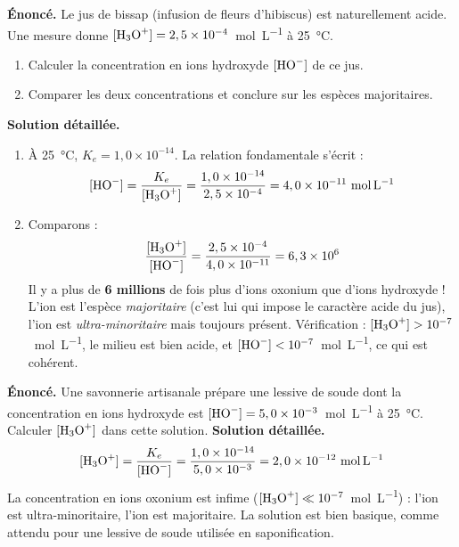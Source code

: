 \documentclass[11pt]{article}
\begin{document}
\begin{exoresolu}
\textbf{Énoncé.} Le jus de bissap (infusion de fleurs d'hibiscus) est naturellement acide. Une mesure donne $[\ce{H3O+}] = 2,5 \times 10^{-4}$~\si{mol.L^{-1}} à \SI{25}{\celsius}.
\begin{enumerate}
\item Calculer la concentration en ions hydroxyde $[\ce{HO-}]$ de ce jus.
\item Comparer les deux concentrations et conclure sur les espèces majoritaires.
\end{enumerate}
\tcblower
\textbf{Solution détaillée.}
\begin{enumerate}
\item À \SI{25}{\celsius}, $K_e = 1,0 \times 10^{-14}$. La relation fondamentale s'écrit :
\[ [\ce{HO-}] = \frac{K_e}{[\ce{H3O+}]} = \frac{1,0 \times 10^{-14}}{2,5 \times 10^{-4}} = 4,0 \times 10^{-11}~\si{mol.L^{-1}} \]
\item Comparons :
\[ \frac{[\ce{H3O+}]}{[\ce{HO-}]} = \frac{2,5 \times 10^{-4}}{4,0 \times 10^{-11}} = 6,3 \times 10^{6} \]
Il y a plus de \textbf{6 millions} de fois plus d'ions oxonium que d'ions hydroxyde ! L'ion  est l'espèce \emph{majoritaire} (c'est lui qui impose le caractère acide du jus), l'ion  est \emph{ultra-minoritaire} mais toujours présent. Vérification : $[\ce{H3O+}] > 10^{-7}$~\si{mol.L^{-1}}, le milieu est bien acide, et $[\ce{HO-}] < 10^{-7}$~\si{mol.L^{-1}}, ce qui est cohérent.
\end{enumerate}
\end{exoresolu}

\begin{exoresolu}
\textbf{Énoncé.} Une savonnerie artisanale prépare une lessive de soude dont la concentration en ions hydroxyde est $[\ce{HO-}] = 5,0 \times 10^{-3}$~\si{mol.L^{-1}} à \SI{25}{\celsius}. Calculer $[\ce{H3O+}]$ dans cette solution.
\tcblower
\textbf{Solution détaillée.}
\[ [\ce{H3O+}] = \frac{K_e}{[\ce{HO-}]} = \frac{1,0 \times 10^{-14}}{5,0 \times 10^{-3}} = 2,0 \times 10^{-12}~\si{mol.L^{-1}} \]
La concentration en ions oxonium est infime ($[\ce{H3O+}] \ll 10^{-7}$~\si{mol.L^{-1}}) : l'ion  est ultra-minoritaire, l'ion  est majoritaire. La solution est bien basique, comme attendu pour une lessive de soude utilisée en saponification.
\end{exoresolu}
\end{document}
